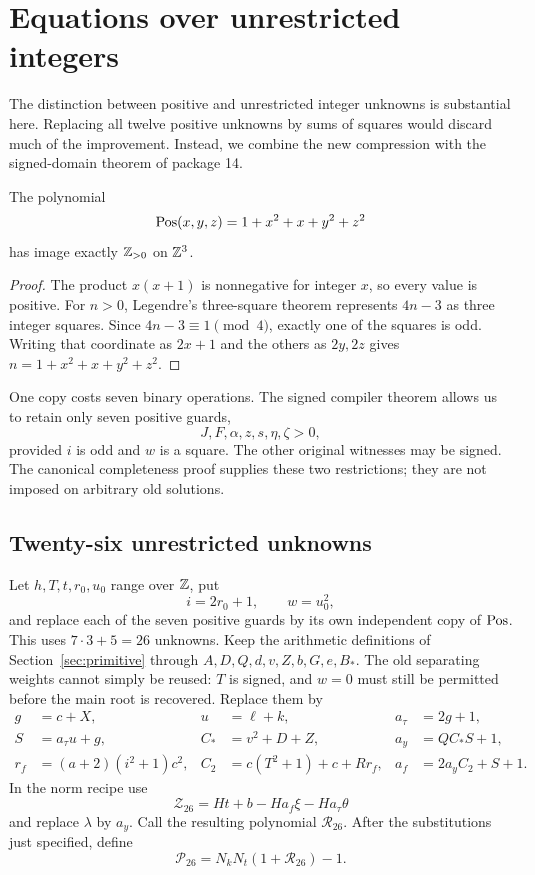 \section{Equations over unrestricted integers}
\label{sec:integers}

The distinction between positive and unrestricted integer unknowns is
substantial here.  Replacing all twelve positive unknowns by sums of
squares would discard much of the improvement.  Instead, we combine the
new compression with the signed-domain theorem of package 14.

\begin{lemma}
The polynomial
\[
\operatorname{Pos}(x,y,z)=1+x^2+x+y^2+z^2
\]
has image exactly $\mathbb Z_{>0}$ on $\mathbb Z^3$.
\end{lemma}
\begin{proof}
The product $x(x+1)$ is nonnegative for integer $x$, so every value is
positive.  For $n>0$, Legendre's three-square theorem represents
$4n-3$ as three integer squares.  Since $4n-3\equiv1\pmod4$, exactly
one of the squares is odd.  Writing that coordinate as $2x+1$ and the
others as $2y,2z$ gives $n=1+x^2+x+y^2+z^2$.
\end{proof}

One copy costs seven binary operations.  The signed compiler theorem
allows us to retain only seven positive guards,
\[
J,F,\alpha,z,s,\eta,\zeta>0,
\]
provided $i$ is odd and $w$ is a square.  The other original witnesses
may be signed.  The canonical completeness proof supplies these two
restrictions; they are not imposed on arbitrary old solutions.

\subsection{Twenty-six unrestricted unknowns}

Let $h,T,t,r_0,u_0$ range over $\mathbb Z$, put
\[
i=2r_0+1,\qquad w=u_0^2,
\]
and replace each of the seven positive guards by its own independent
copy of $\operatorname{Pos}$.  This uses $7\cdot3+5=26$ unknowns.
Keep the arithmetic definitions of Section~\ref{sec:primitive} through
$A,D,Q,d,v,Z,b,G,e,B_*$.  The old separating weights cannot simply be
reused: $T$ is signed, and $w=0$ must still be permitted before the main
root is recovered.  Replace them by
\begin{align}
g&=c+X,&u&=\ell+k,&a_\tau&=2g+1,\nonumber\\
S&=a_\tau u+g,&C_*&=v^2+D+Z,&a_y&=QC_*S+1,\label{eq:integerweights}\\
r_f&=(a+2)(i^2+1)c^2,&C_2&=c(T^2+1)+c+Rr_f,
&a_f&=2a_yC_2+S+1.\nonumber
\end{align}
In the norm recipe use
\[
\mathcal Z_{26}=Ht+b-Ha_f\xi-Ha_\tau\theta
\]
and replace $\lambda$ by $a_y$.  Call the resulting polynomial
$\mathcal R_{26}$.  After the substitutions just specified, define
\begin{equation}
\boxed{\mathcal P_{26}=N_kN_t(1+\mathcal R_{26})-1.}
\label{eq:P26}
\end{equation}

